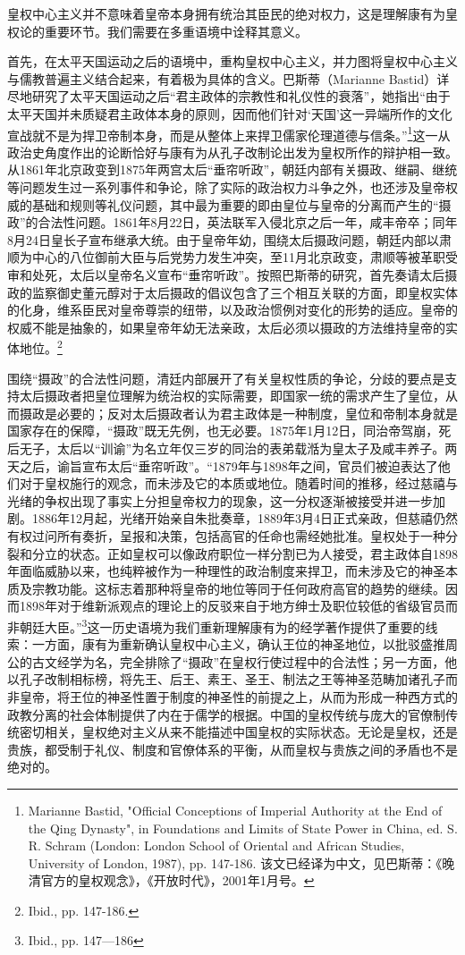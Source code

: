 \documentclass[a4paper, 12pt, openright]{ctexbook}
\begin{document}
皇权中心主义并不意味着皇帝本身拥有统治其臣民的绝对权力，这是理解康有为皇权论的重要环节。我们需要在多重语境中诠释其意义。

首先，在太平天国运动之后的语境中，重构皇权中心主义，并力图将皇权中心主义与儒教普遍主义结合起来，有着极为具体的含义。巴斯蒂（Marianne Bastid）详尽地研究了太平天国运动之后“君主政体的宗教性和礼仪性的衰落”，她指出“由于太平天国并未质疑君主政体本身的原则，因而他们针对‘天国’这一异端所作的文化宣战就不是为捍卫帝制本身，而是从整体上来捍卫儒家伦理道德与信条。”\footnote{Marianne Bastid, "Official Conceptions of Imperial Authority at the End of the Qing Dynasty", in Foundations and Limits of State Power in China, ed. S. R. Schram (London: London School of Oriental and African Studies, University of London, 1987), pp. 147-186. 该文已经译为中文，见巴斯蒂：《晚清官方的皇权观念》，《开放时代》，2001年1月号。}这一从政治史角度作出的论断恰好与康有为从孔子改制论出发为皇权所作的辩护相一致。从1861年北京政变到1875年两宫太后“垂帘听政”，朝廷内部有关摄政、继嗣、继统等问题发生过一系列事件和争论，除了实际的政治权力斗争之外，也还涉及皇帝权威的基础和规则等礼仪问题，其中最为重要的即由皇位与皇帝的分离而产生的“摄政”的合法性问题。1861年8月22日，英法联军入侵北京之后一年，咸丰帝卒；同年8月24日皇长子宣布继承大统。由于皇帝年幼，围绕太后摄政问题，朝廷内部以肃顺为中心的八位御前大臣与后党势力发生冲突，至11月北京政变，肃顺等被革职受审和处死，太后以皇帝名义宣布“垂帘听政”。按照巴斯蒂的研究，首先奏请太后摄政的监察御史董元醇对于太后摄政的倡议包含了三个相互关联的方面，即皇权实体的化身，维系臣民对皇帝尊崇的纽带，以及政治惯例对变化的形势的适应。皇帝的权威不能是抽象的，如果皇帝年幼无法亲政，太后必须以摄政的方法维持皇帝的实体地位。\footnote{Ibid., pp. 147-186.}

围绕“摄政”的合法性问题，清廷内部展开了有关皇权性质的争论，分歧的要点是支持太后摄政者把皇位理解为统治权的实际需要，即国家一统的需求产生了皇位，从而摄政是必要的；反对太后摄政者认为君主政体是一种制度，皇位和帝制本身就是国家存在的保障，“摄政”既无先例，也无必要。1875年1月12日，同治帝驾崩，死后无子，太后以“训谕”为名立年仅三岁的同治的表弟载湉为皇太子及咸丰养子。两天之后，谕旨宣布太后“垂帘听政”。“1879年与1898年之间，官员们被迫表达了他们对于皇权施行的观念，而未涉及它的本质或地位。随着时间的推移，经过慈禧与光绪的争权出现了事实上分担皇帝权力的现象，这一分权逐渐被接受并进一步加剧。1886年12月起，光绪开始亲自朱批奏章，1889年3月4日正式亲政，但慈禧仍然有权过问所有奏折，呈报和决策，包括高官的任命也需经她批准。皇权处于一种分裂和分立的状态。正如皇权可以像政府职位一样分割已为人接受，君主政体自1898年面临威胁以来，也纯粹被作为一种理性的政治制度来捍卫，而未涉及它的神圣本质及宗教功能。这标志着那种将皇帝的地位等同于任何政府高官的趋势的继续。因而1898年对于维新派观点的理论上的反驳来自于地方绅士及职位较低的省级官员而非朝廷大臣。”\footnote{Ibid., pp. 147—186}这一历史语境为我们重新理解康有为的经学著作提供了重要的线索：一方面，康有为重新确认皇权中心主义，确认王位的神圣地位，以批驳盛推周公的古文经学为名，完全排除了“摄政”在皇权行使过程中的合法性；另一方面，他以孔子改制相标榜，将先王、后王、素王、圣王、制法之王等神圣范畴加诸孔子而非皇帝，将王位的神圣性置于制度的神圣性的前提之上，从而为形成一种西方式的政教分离的社会体制提供了内在于儒学的根据。中国的皇权传统与庞大的官僚制传统密切相关，皇权绝对主义从来不能描述中国皇权的实际状态。无论是皇权，还是贵族，都受制于礼仪、制度和官僚体系的平衡，从而皇权与贵族之间的矛盾也不是绝对的。
\end{document}
